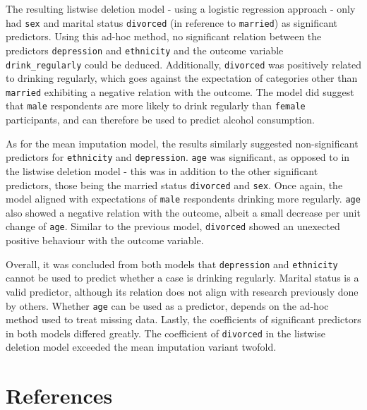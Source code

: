 \documentclass[
]{article}
\begin{document}
The resulting listwise deletion model - using a logistic regression approach - only had \texttt{sex} and marital status \texttt{divorced} (in reference to \texttt{married}) as significant predictors. Using this ad-hoc method, no significant relation between the predictors \texttt{depression} and \texttt{ethnicity} and the outcome variable \texttt{drink\_regularly} could be deduced. Additionally, \texttt{divorced} was positively related to drinking regularly, which goes against the expectation of categories other than \texttt{married} exhibiting a negative relation with the outcome. The model did suggest that \texttt{male} respondents are more likely to drink regularly than \texttt{female} participants, and can therefore be used to predict alcohol consumption.

As for the mean imputation model, the results similarly suggested non-significant predictors for \texttt{ethnicity} and \texttt{depression}. \texttt{age} was significant, as opposed to in the listwise deletion model - this was in addition to the other significant predictors, those being the married status \texttt{divorced} and \texttt{sex}. Once again, the model aligned with expectations of \texttt{male} respondents drinking more regularly. \texttt{age} also showed a negative relation with the outcome, albeit a small decrease per unit change of \texttt{age}. Similar to the previous model, \texttt{divorced} showed an unexected positive behaviour with the outcome variable.

Overall, it was concluded from both models that \texttt{depression} and \texttt{ethnicity} cannot be used to predict whether a case is drinking regularly. Marital status is a valid predictor, although its relation does not align with research previously done by others. Whether \texttt{age} can be used as a predictor, depends on the ad-hoc method used to treat missing data. Lastly, the coefficients of significant predictors in both models differed greatly. The coefficient of \texttt{divorced} in the listwise deletion model exceeded the mean imputation variant twofold.

\newpage

\hypertarget{references}{%
\section{References}\label{references}}
\end{document}
